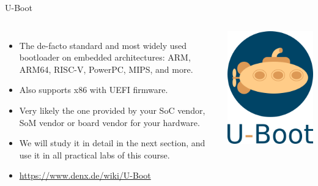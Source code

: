 \begin{frame}{U-Boot}
  \begin{columns}
    \begin{itemize}
    \item The de-facto standard and most widely used bootloader on
      embedded architectures: ARM, ARM64, RISC-V, PowerPC, MIPS, and
      more.
    \item Also supports x86 with UEFI firmware.
    \item Very likely the one provided by your SoC vendor, SoM vendor
      or board vendor for your hardware.
    \item We will study it in detail in the next section, and use it in
      all practical labs of this course.
    \item \url{https://www.denx.de/wiki/U-Boot}
    \end{itemize}
    \includegraphics[width=\textwidth]{slides/sysdev-bootloaders-sequence/u-boot.png}
  \end{columns}
\end{frame}

